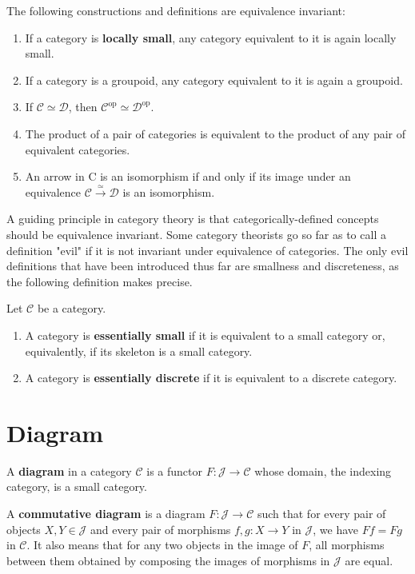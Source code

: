 \documentclass[12pt, oneside]{book}
\begin{document}
\begin{proposition}
    The following constructions and definitions are equivalence invariant:
    \begin{enumerate}
        \item
              If a category is \textbf{locally small}, any category equivalent to it is again locally small.
        \item     If a category is a groupoid, any category equivalent to it is again a groupoid.
        \item   If $\mathcal{C} \simeq \mathcal{D}$, then $\mathcal{C}^{\mathrm{op}} \simeq \mathcal{D}^{\mathrm{op}}$.
        \item   The product of a pair of categories is equivalent to the product of any pair of equivalent categories.
        \item   An arrow in C is an isomorphism if and only if its image under an equivalence $\mathcal{C} \xrightarrow{\simeq} \mathcal{D}$ is an isomorphism.
    \end{enumerate}
\end{proposition}


A guiding principle in category theory is that categorically-defined concepts should be equivalence invariant. Some category theorists go so far as to call a definition "evil" if it is not invariant under equivalence of categories. The only evil definitions that have been introduced thus far are smallness and discreteness, as the following definition makes precise.

\begin{definition}
    Let $\mathcal{C}$ be a category.
    \begin{enumerate}
        \item  A category is \textbf{essentially small} if it is equivalent to a small category or, equivalently, if its skeleton is a small category.
        \item A category is \textbf{essentially discrete} if it is equivalent to a discrete category.
    \end{enumerate}
\end{definition}


\section{Diagram}
\begin{definition}
    A \textbf{diagram} in a category $\mathcal{C}$ is a functor $F: \mathcal{J} \rightarrow \mathcal{C}$ whose domain, the indexing category, is a small category.

    A \textbf{commutative diagram} is a diagram $F: \mathcal{J} \rightarrow \mathcal{C}$ such that for every pair of objects $X, Y \in \mathcal{J}$ and every pair of morphisms $f, g: X \rightarrow Y$ in $\mathcal{J}$, we have $F f=F g$ in $\mathcal{C}$. It also means that for any two objects in the image of $F$, all morphisms between them obtained by composing the images of morphisms in $\mathcal{J}$ are equal.
\end{definition}
\end{document}
